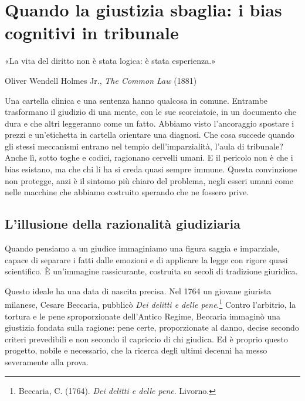 \chapter{Quando la giustizia sbaglia: i bias cognitivi in tribunale}
\label{cap:p2c28}

\epigraph{«La vita del diritto non è stata logica: è stata esperienza.»}{Oliver Wendell Holmes Jr., \textit{The Common Law} (1881)}

Una cartella clinica e una sentenza hanno qualcosa in comune. Entrambe trasformano il giudizio di una mente, con le sue scorciatoie, in un documento che dura e che altri leggeranno come un fatto. Abbiamo visto l'ancoraggio spostare i prezzi e un'etichetta in cartella orientare una diagnosi. Che cosa succede quando gli stessi meccanismi entrano nel tempio dell'imparzialit\`{a}, l'aula di tribunale? Anche l\`{i}, sotto toghe e codici, ragionano cervelli umani. E il pericolo non \`{e} che i bias esistano, ma che chi li ha si creda quasi sempre immune. Questa convinzione non protegge, anzi \`{e} il sintomo pi\`{u} chiaro del problema, negli esseri umani come nelle macchine che abbiamo costruito sperando che ne fossero prive.

\section{L'illusione della razionalit\`{a} giudiziaria}

Quando pensiamo a un giudice immaginiamo una figura saggia e imparziale, capace di separare i fatti dalle emozioni e di applicare la legge con rigore quasi scientifico. \`{E} un'immagine rassicurante, costruita su secoli di tradizione giuridica.

Questo ideale ha una data di nascita precisa. Nel 1764 un giovane giurista milanese, Cesare Beccaria, pubblic\`{o} \textit{Dei delitti e delle pene}.\footnote{Beccaria, C. (1764). \textit{Dei delitti e delle pene}. Livorno.} Contro l'arbitrio, la tortura e le pene sproporzionate dell'Antico Regime, Beccaria immagin\`{o} una giustizia fondata sulla ragione: pene certe, proporzionate al danno, decise secondo criteri prevedibili e non secondo il capriccio di chi giudica. Ed \`{e} proprio questo progetto, nobile e necessario, che la ricerca degli ultimi decenni ha messo severamente alla prova.


